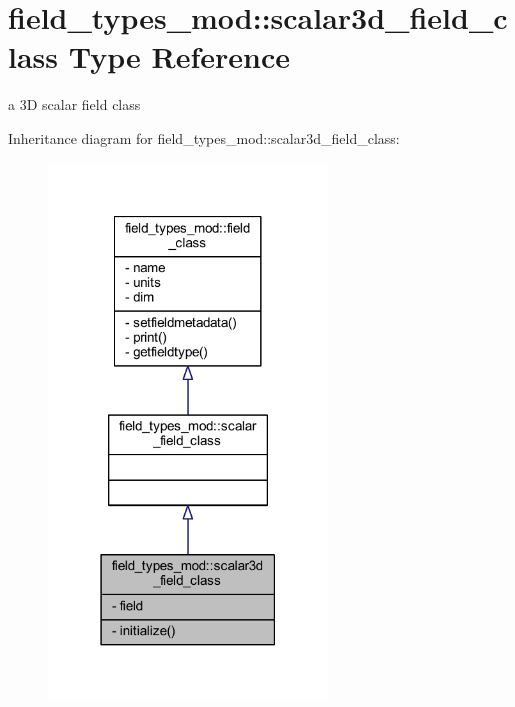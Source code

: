 \hypertarget{structfield__types__mod_1_1scalar3d__field__class}{}\section{field\+\_\+types\+\_\+mod\+:\+:scalar3d\+\_\+field\+\_\+class Type Reference}
\label{structfield__types__mod_1_1scalar3d__field__class}


a 3D scalar field class  




Inheritance diagram for field\+\_\+types\+\_\+mod\+:\+:scalar3d\+\_\+field\+\_\+class\+:\nopagebreak
\begin{figure}[H]
\begin{center}
\leavevmode
\includegraphics[width=210pt]{structfield__types__mod_1_1scalar3d__field__class__inherit__graph}
\end{center}
\end{figure}


